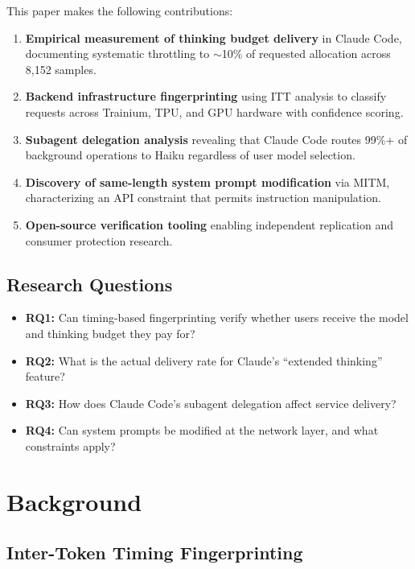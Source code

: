 \documentclass[11pt,a4paper]{article}
\begin{document}
This paper makes the following contributions:

\begin{enumerate}
    \item \textbf{Empirical measurement of thinking budget delivery} in Claude Code, documenting systematic throttling to $\sim$10\% of requested allocation across 8,152 samples.
    \item \textbf{Backend infrastructure fingerprinting} using ITT analysis to classify requests across Trainium, TPU, and GPU hardware with confidence scoring.
    \item \textbf{Subagent delegation analysis} revealing that Claude Code routes 99\%+ of background operations to Haiku regardless of user model selection.
    \item \textbf{Discovery of same-length system prompt modification} via MITM, characterizing an API constraint that permits instruction manipulation.
    \item \textbf{Open-source verification tooling} enabling independent replication and consumer protection research.
\end{enumerate}

\subsection{Research Questions}

\begin{itemize}
    \item \textbf{RQ1:} Can timing-based fingerprinting verify whether users receive the model and thinking budget they pay for?
    \item \textbf{RQ2:} What is the actual delivery rate for Claude's ``extended thinking'' feature?
    \item \textbf{RQ3:} How does Claude Code's subagent delegation affect service delivery?
    \item \textbf{RQ4:} Can system prompts be modified at the network layer, and what constraints apply?
\end{itemize}

\section{Background}

\subsection{Inter-Token Timing Fingerprinting}
\end{document}
